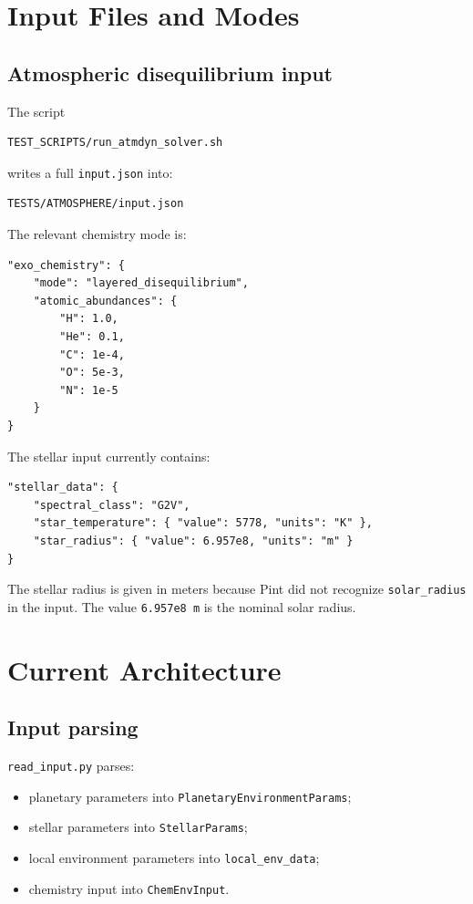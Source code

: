 \documentclass[11pt]{article}
\begin{document}
\section{Input Files and Modes}

\subsection{Atmospheric disequilibrium input}

The script

\begin{lstlisting}
TEST_SCRIPTS/run_atmdyn_solver.sh
\end{lstlisting}

writes a full \texttt{input.json} into:

\begin{lstlisting}
TESTS/ATMOSPHERE/input.json
\end{lstlisting}

The relevant chemistry mode is:

\begin{lstlisting}
"exo_chemistry": {
    "mode": "layered_disequilibrium",
    "atomic_abundances": {
        "H": 1.0,
        "He": 0.1,
        "C": 1e-4,
        "O": 5e-3,
        "N": 1e-5
    }
}
\end{lstlisting}

The stellar input currently contains:

\begin{lstlisting}
"stellar_data": {
    "spectral_class": "G2V",
    "star_temperature": { "value": 5778, "units": "K" },
    "star_radius": { "value": 6.957e8, "units": "m" }
}
\end{lstlisting}

The stellar radius is given in meters because Pint did not recognize
\texttt{solar\_radius} in the input. The value \texttt{6.957e8 m} is the nominal
solar radius.

\section{Current Architecture}

\subsection{Input parsing}

\texttt{read\_input.py} parses:

\begin{itemize}
  \item planetary parameters into \texttt{PlanetaryEnvironmentParams};
  \item stellar parameters into \texttt{StellarParams};
  \item local environment parameters into \texttt{local\_env\_data};
  \item chemistry input into \texttt{ChemEnvInput}.
\end{itemize}
\end{document}
